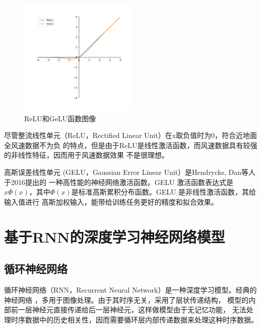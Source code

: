 \documentclass[AutoFakeBold]{LZUThesis}
\begin{document}
\begin{figure}[H]
	\centering
    \includegraphics[width=0.5\textwidth]{figures/relu_gelu.pdf}
    \caption{ReLU和GeLU函数图像}
    \label{fig_relu_gelu}
\end{figure}

尽管整流线性单元（ReLU，Rectified Linear Unit）在x取负值时为0，符合近地面全风速数据不为负
的特点，但是由于ReLU是线性激活函数，而风速数据具有较强的非线性特征，因而用于风速数据效果
不是很理想。

高斯误差线性单元 (GELU，Gaussian Error Linear Unit）是Hendrycks, Dan等人于2016提出的
\cite{hendrycks2016gaussian}一种高性能的神经网络激活函数。GELU 激活函数表达式是
$x\Phi(x)$，其中$\Phi(x)$是标准高斯累积分布函数。GELU 是非线性激活函数，其给输入值进行
高斯加权输入，能带给训练任务更好的精度和拟合效果。

\section{基于RNN的深度学习神经网络模型}
\subsection{循环神经网络}
循环神经网络（RNN，Recurrent Neural Network）是一种深度学习模型。经典的神经网络
\cite{rumelhart1986learning}，多用于图像处理。由于其时序无关，采用了层状传递结构，
模型的内部前一层神经元直接传递给后一层神经元，这样做模型由于无记忆功能，
无法处理时序数据中的历史相关性，因而需要循环层内部传递数据来处理这种时序数据。
\end{document}
